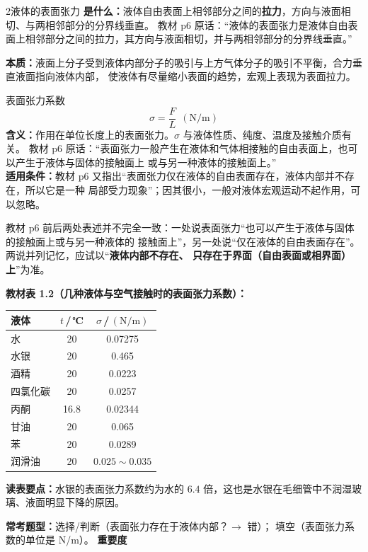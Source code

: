 \begin{kaodian}{2}{液体的表面张力}
\textbf{是什么：}液体自由表面上相邻部分之间的\textbf{拉力}，方向与液面相切、与两相邻部分的分界线垂直。
教材 p6 原话：“液体的表面张力是液体自由表面上相邻部分之间的拉力，其方向与液面相切，并与两相邻部分的分界线垂直。”

\textbf{本质：}液面上分子受到液体内部分子的吸引与上方气体分子的吸引不平衡，合力垂直液面指向液体内部，
使液体有尽量缩小表面的趋势，宏观上表现为表面拉力。

\begin{gongshi}{表面张力系数}
\[ \sigma=\frac{F}{L}\ \ (\mathrm{N/m}) \]
\textbf{含义：}作用在单位长度上的表面张力。$\sigma$ 与液体性质、纯度、温度及接触介质有关。
教材 p6 原话：“表面张力一般产生在液体和气体相接触的自由表面上，也可以产生于液体与固体的接触面上
或与另一种液体的接触面上。”\\
\textbf{适用条件：}教材 p6 又指出“表面张力仅在液体的自由表面存在，液体内部并不存在，所以它是一种
局部受力现象”；因其很小，一般对液体宏观运动不起作用，可以忽略。
\end{gongshi}

\begin{tishi}
教材 p6 前后两处表述并不完全一致：一处说表面张力“也可以产生于液体与固体的接触面上或与另一种液体的
接触面上”，另一处说“仅在液体的自由表面存在”。两说并列记忆，应试以“\textbf{液体内部不存在、
只存在于界面（自由表面或相界面）上}”为准。
\end{tishi}

\textbf{教材表 1.2（几种液体与空气接触时的表面张力系数）：}
\begin{center}
\begin{tabular}{@{}lcc@{}}
\toprule
液体 & $t$\,/\,℃ & $\sigma$\,/\,$(\mathrm{N/m})$ \\
\midrule
水 & 20 & 0.07275 \\
水银 & 20 & 0.465 \\
酒精 & 20 & 0.0223 \\
四氯化碳 & 20 & 0.0257 \\
丙酮 & 16.8 & 0.02344 \\
甘油 & 20 & 0.065 \\
苯 & 20 & 0.0289 \\
润滑油 & 20 & $0.025\sim0.035$ \\
\bottomrule
\end{tabular}
\end{center}
\textbf{读表要点：}水银的表面张力系数约为水的 $6.4$ 倍，这也是水银在毛细管中不润湿玻璃、液面明显下降的原因。

\textbf{常考题型：}选择/判断（表面张力存在于液体内部？$\to$ 错）；
填空（表面张力系数的单位是 N/m）。
\textbf{重要度 }\quad{}\quad{}
\end{kaodian}

